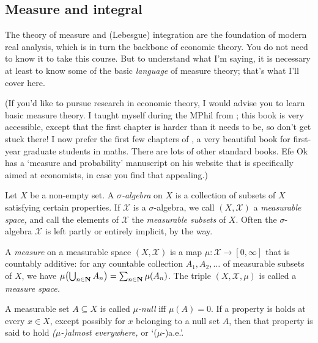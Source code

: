 \documentclass[11pt,letterpaper,reqno,oneside]{book}
\begin{document}
\begin{appendices}





\chapter{Measure and integral}
\label{ch:meas}

The theory of measure and (Lebesgue) integration are the foundation of modern real analysis, which is in turn the backbone of economic theory.
You do not need to know it to take this course.
But to understand what I'm saying,
it is necessary at least to know some of the basic \emph{language} of measure theory; that's what I'll cover here.

(If you'd like to pursue research in economic theory, I would advise you to learn basic measure theory.
I taught myself during the MPhil from \textcite{Rosenthal2006}; this book is very accessible, except that the first chapter is harder than it needs to be, so don't get stuck there! I now prefer the first few chapters of \textcite{Folland1999}, a very beautiful book for first-year graduate students in maths. There are lots of other standard books. Efe Ok has a `measure and probability' manuscript on his website that is specifically aimed at economists, in case you find that appealing.)


Let $X$ be a non-empty set.
A \emph{$\sigma$-algebra} on $X$ is a collection of subsets of $X$ satisfying certain properties.
If $\mathcal{X}$ is a $\sigma$-algebra, we call $(X,\mathcal{X})$ a \emph{measurable space,} and call the elements of $\mathcal{X}$ the \emph{measurable subsets} of $X$.
Often the $\sigma$-algebra $\mathcal{X}$ is left partly or entirely implicit, by the way.

A \emph{measure} on a measurable space $(X,\mathcal{X})$ is a map $\mu : \mathcal{X} \to [0,\infty]$ that is countably additive:
for any countable collection $A_1,A_2,\dots$ of measurable subsets of $X$,
we have $\mu\left( \Union_{n \in \N} A_n \right) = \sum_{n \in \N} \mu(A_n)$.
The triple $(X,\mathcal{X},\mu)$ is called a \emph{measure space.}

A measurable set $A \subseteq X$ is called \emph{$\mu$-null} iff $\mu(A)=0$. If a property is holds at every $x \in X$, except possibly for $x$ belonging to a null set $A$, then that property is said to hold \emph{($\mu$-)almost everywhere,} or `($\mu$-)a.e.'.


\end{appendices}
\end{document}
